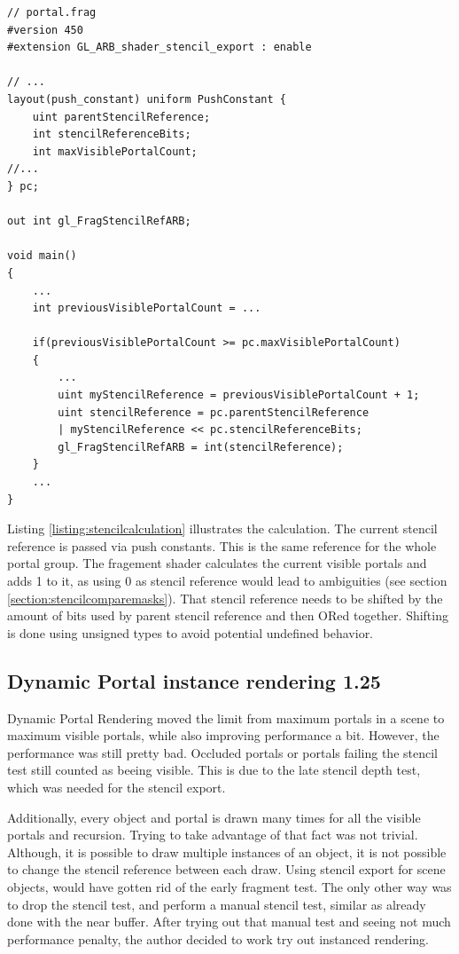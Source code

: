 \begin{lstlisting}[caption={Calculate Stencil Reference in Shader}, label=listing:stencilcalculation]
// portal.frag
#version 450
#extension GL_ARB_shader_stencil_export : enable

// ...
layout(push_constant) uniform PushConstant {	
	uint parentStencilReference;
	int stencilReferenceBits;
	int maxVisiblePortalCount;
//...
} pc;

out int gl_FragStencilRefARB;

void main()
{
	...
	int previousVisiblePortalCount = ...
	
	if(previousVisiblePortalCount >= pc.maxVisiblePortalCount)
	{
		...
		uint myStencilReference = previousVisiblePortalCount + 1;
		uint stencilReference = pc.parentStencilReference 
		| myStencilReference << pc.stencilReferenceBits;
		gl_FragStencilRefARB = int(stencilReference);
	}	
	...
}
\end{lstlisting}

Listing \ref{listing:stencilcalculation} illustrates the calculation. The current stencil reference is passed via push constants. This is the same reference for the whole portal group. The fragement shader calculates the current visible portals and adds 1 to it, as using 0 as stencil reference would lead to ambiguities (see section \ref{section:stencilcomparemasks}). That stencil reference needs to be shifted by the amount of bits used by parent stencil reference and then ORed together. Shifting is done using unsigned types to avoid potential undefined behavior.

\subsection{Dynamic Portal instance rendering 1.25}
Dynamic Portal Rendering moved the limit from maximum portals in a scene to maximum visible portals, while also improving performance a bit. However, the performance was still pretty bad. Occluded portals or portals failing the stencil test still counted as beeing visible. This is due to the late stencil depth test, which was needed for the stencil export.

Additionally, every object and portal is drawn many times for all the visible portals and recursion. Trying to take advantage of that fact was not trivial. Although, it is possible to draw multiple instances of an object, it is not possible to change the stencil reference between each draw. Using stencil export for scene objects, would have gotten rid of the early fragment test. The only other way was to drop the stencil test, and perform a manual stencil test, similar as already done with the near buffer. After trying out that manual test and seeing not much performance penalty, the author decided to work try out instanced rendering.

